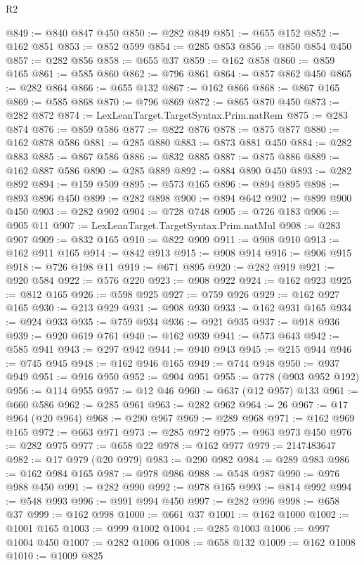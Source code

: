 \begin{lexlean}{R2}
\begin{coremodule}
@849 := @840 @847 @450
@850 := @282 @849
@851 := @655 @152
@852 := @162 @851
@853 := @852 @599
@854 := @285 @853
@856 := @850 @854 @450
@857 := @282 @856
@858 := @655 @37
@859 := @162 @858
@860 := @859 @165
@861 := @585 @860
@862 := @796 @861
@864 := @857 @862 @450
@865 := @282 @864
@866 := @655 @132
@867 := @162 @866
@868 := @867 @165
@869 := @585 @868
@870 := @796 @869
@872 := @865 @870 @450
@873 := @282 @872
@874 := LexLeanTarget.TargetSyntax.Prim.natRem
@875 := @283 @874
@876 := @859 @586
@877 := @822 @876
@878 := @875 @877
@880 := @162 @878 @586
@881 := @285 @880
@883 := @873 @881 @450
@884 := @282 @883
@885 := @867 @586
@886 := @832 @885
@887 := @875 @886
@889 := @162 @887 @586
@890 := @285 @889
@892 := @884 @890 @450
@893 := @282 @892
@894 := @159 @509
@895 := @573 @165
@896 := @894 @895
@898 := @893 @896 @450
@899 := @282 @898
@900 := @894 @642
@902 := @899 @900 @450
@903 := @282 @902
@904 := @728 @748
@905 := @726 @183
@906 := @905 @11
@907 := LexLeanTarget.TargetSyntax.Prim.natMul
@908 := @283 @907
@909 := @832 @165
@910 := @822 @909
@911 := @908 @910
@913 := @162 @911 @165
@914 := @842 @913
@915 := @908 @914
@916 := @906 @915
@918 := @726 @198 @11
@919 := @671 @895
@920 := @282 @919
@921 := @920 @584
@922 := @576 @220
@923 := @908 @922
@924 := @162 @923
@925 := @812 @165
@926 := @598 @925
@927 := @759 @926
@929 := @162 @927 @165
@930 := @213 @929
@931 := @908 @930
@933 := @162 @931 @165
@934 := @924 @933
@935 := @759 @934
@936 := @921 @935
@937 := @918 @936
@939 := @920 @619 @761
@940 := @162 @939
@941 := @573 @643
@942 := @585 @941
@943 := @297 @942
@944 := @940 @943
@945 := @215 @944
@946 := @745 @945
@948 := @162 @946 @165
@949 := @744 @948
@950 := @937 @949
@951 := @916 @950
@952 := @904 @951
@955 := @778 (@903 @952 @192)
@956 := @114 @955
@957 := @12 @46
@960 := @637 (@12 @957) @133
@961 := @660 @586
@962 := @285 @961
@963 := @282 @962
@964 := 26
@967 := @17 @964 (@20 @964)
@968 := @290 @967
@969 := @289 @968
@971 := @162 @969 @165
@972 := @663 @971
@973 := @285 @972
@975 := @963 @973 @450
@976 := @282 @975
@977 := @658 @22
@978 := @162 @977
@979 := 2147483647
@982 := @17 @979 (@20 @979)
@983 := @290 @982
@984 := @289 @983
@986 := @162 @984 @165
@987 := @978 @986
@988 := @548 @987
@990 := @976 @988 @450
@991 := @282 @990
@992 := @978 @165
@993 := @814 @992
@994 := @548 @993
@996 := @991 @994 @450
@997 := @282 @996
@998 := @658 @37
@999 := @162 @998
@1000 := @661 @37
@1001 := @162 @1000
@1002 := @1001 @165
@1003 := @999 @1002
@1004 := @285 @1003
@1006 := @997 @1004 @450
@1007 := @282 @1006
@1008 := @658 @132
@1009 := @162 @1008
@1010 := @1009 @825

\end{coremodule}
\end{lexlean}
